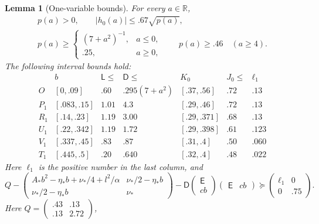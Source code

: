 \documentclass[11pt]{article}
\newcommand{\R}{\mathbb R}
\newtheorem{lemma}[theorem]{Lemma}
\theoremstyle{definition}
\theoremstyle{remark}
\numberwithin{equation}{section}
\begin{document}
\begin{lemma}[One-variable bounds]\label{sc:bounds}
For every $a\in\R$,
\begin{equation}\label{sc:p-h-bounds}
 \begin{gathered}
 p(a)>0,\qquad |h_0(a)|\le .67\sqrt{p(a)},\\
 p(a)\ge\begin{cases}(7+a^2)^{-1},&a\le0,\\ .25,&a\ge0,\end{cases}
 \qquad p(a)\ge .46\quad(a\ge4).
 \end{gathered}
\end{equation}
The following interval bounds hold:
\begin{equation}\label{sc:interval-table}
\begin{array}{c|cccccc}
 &b&\mathsf L\le&\mathsf D\le&K_0&J_0\le&\ell_1\\\hline
 O &[0,.09]&.60&.295(7+a^2)&[.37,.56]&.72&.13\\
 P_1 &[.083,.15]&1.01&4.3&[.29,.46]&.72&.13\\
 R_1 &[.14,.23]&1.19&3.00&[.29,.371]&.68&.13\\
 U_1 &[.22,.342]&1.19&1.72&[.29,.398]&.61&.123\\
 V_1 &[.337,.45]&.83&.87&[.31,.4]&.50&.060\\
 T_1 &[.445,.5]&.20&.640&[.32,.4]&.48&.022
\end{array}
\end{equation}
Here $\ell_1$ is the positive number in the last column, and
\begin{equation}\label{sc:local-surplus}
 Q-
 \begin{pmatrix}
 A_*b^2-\eta_*b+\nu_*/4+l^2/\alpha&\nu_*/2-\eta_*b\\
 \nu_*/2-\eta_*b&\nu_*
 \end{pmatrix}
 -\mathsf D
 \begin{pmatrix}\mathsf E\\cb\end{pmatrix}
 \begin{pmatrix}\mathsf E&cb\end{pmatrix}
 \succeq\begin{pmatrix}\ell_1&0\\0&.75\end{pmatrix}.
\end{equation}
Here $Q=\left(\begin{smallmatrix}.43&.13\\.13&2.72\end{smallmatrix}\right)$,

\end{lemma}
\end{document}
